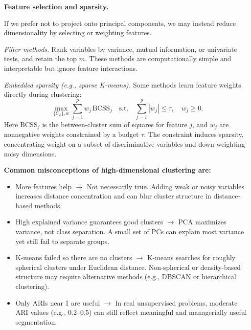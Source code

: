 \medskip

\textbf{Feature selection and sparsity.}

If we prefer not to project onto principal components, we may instead reduce dimensionality by selecting or weighting features.

\emph{Filter methods.}
Rank variables by variance, mutual information, or univariate tests, and retain the top $m$. These methods are computationally simple and interpretable but ignore feature interactions.

\emph{Embedded sparsity (e.g., sparse K-means).}
Some methods learn feature weights directly during clustering:
\[
\max_{\{C_k\}, w} \sum_{j=1}^p w_j \, \text{BCSS}_j 
\quad \text{s.t.} \quad 
\sum_{j=1}^p |w_j| \le \tau, 
\quad w_j \ge 0.
\]
Here $\text{BCSS}_j$ is the between-cluster sum of squares for feature $j$, and $w_j$ are nonnegative weights constrained by a budget $\tau$. The constraint induces sparsity, concentrating weight on a subset of discriminative variables and down-weighting noisy dimensions.

\medskip

\textbf{Common misconceptions of high-dimensional clustering are:}
\begin{itemize}[label=$\circ$, itemsep=0.4em]
    \item More features help $\longrightarrow$ Not necessarily true. Adding weak or noisy variables increases distance concentration and can blur cluster structure in distance-based methods.
    \item High explained variance guarantees good clusters $\longrightarrow$ PCA maximizes variance, not class separation. A small set of PCs can explain most variance yet still fail to separate groups.
    \item K-means failed so there are no clusters $\longrightarrow$ K-means searches for roughly spherical clusters under Euclidean distance. Non-spherical or density-based structure may require alternative methods (e.g., DBSCAN or hierarchical clustering).
    \item Only ARIs near 1 are useful $\longrightarrow$ In real unsupervised problems, moderate ARI values (e.g., 0.2--0.5) can still reflect meaningful and managerially useful segmentation.
\end{itemize}

